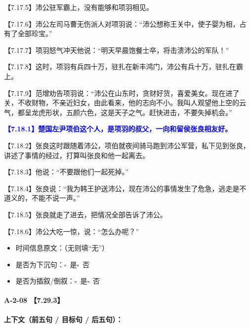 \documentclass[fontset=none,11pt,a4paper]{ctexart}
\newcommand{\answerline}[1]{\underline{\hspace{#1}}}
\newcommand{\choicebox}[1]{$\square$~#1}
\begin{document}
\noindent 【7.17.5】沛公驻军霸上，没有能够和项羽相见。\par
\noindent 【7.17.6】沛公左司马曹无伤派人对项羽说：“沛公想称王关中，使子婴为相，占有了全部珍宝。”\par
\noindent 【7.17.7】项羽怒气冲天他说：“明天早晨饱餐士卒，将击溃沛公的军队！”\par
\noindent 【7.17.8】这时，项羽有兵四十万，驻扎在新丰鸿门，沛公有兵十万，驻扎在霸上。\par
\noindent 【7.17.9】范增劝告项羽说：“沛公在山东时，贪财好货，喜爱美女。现在进了关，不收财物，不亲近妇女，由此看来，他的志向不小。我叫人观望他上空的云气，都呈龙虎形状，五颜六色，这是天子之气。赶快进击，不要失掉机会。”\par
\noindent \textcolor{blue}{\textbf{【7.18.1】楚国左尹项伯这个人，是项羽的叔父，一向和留侯张良相友好。}}\par
\noindent 【7.18.2】张良这时跟随着沛公，项伯就夜间骑马跑到沛公军营，私下见到张良，讲述了事情的经过，打算叫张良和他一起离去。\par
\noindent 【7.18.3】他说：“不要跟他们一起死掉。”\par
\noindent 【7.18.4】张良说：“我为韩王护送沛公，现在沛公的事情发生了危急，逃走是不道义的，不能不说一声。”\par
\noindent 【7.18.5】张良就走了进去，把情况全部告诉了沛公。\par
\noindent 【7.18.6】沛公大吃一惊，说：“怎么办呢？”\par

\begin{itemize}
  \item 时间信息原文：\answerline{7.5cm}（无则填“无”）
  \item 是否为下沉句：\choicebox{是}\quad \choicebox{否}
  \item 是否为插叙/倒叙：\choicebox{是}\quad \choicebox{否}
\end{itemize}

\paragraph{A-2-08 \quad 【7.29.3】}
\textbf{上下文（前五句 / 目标句 / 后五句）：}
\end{document}
